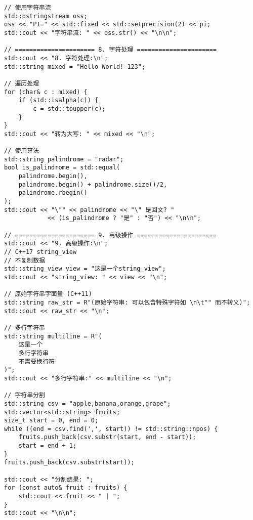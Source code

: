 \begin{lstlisting}
// 使用字符串流
std::ostringstream oss;
oss << "PI=" << std::fixed << std::setprecision(2) << pi;
std::cout << "字符串流: " << oss.str() << "\n\n";

// ====================== 8. 字符处理 ======================
std::cout << "8. 字符处理:\n";
std::string mixed = "Hello World! 123";

// 遍历处理
for (char& c : mixed) {
    if (std::isalpha(c)) {
        c = std::toupper(c);
    }
}
std::cout << "转为大写: " << mixed << "\n";

// 使用算法
std::string palindrome = "radar";
bool is_palindrome = std::equal(
    palindrome.begin(), 
    palindrome.begin() + palindrome.size()/2,
    palindrome.rbegin()
);
std::cout << "\"" << palindrome << "\" 是回文? " 
            << (is_palindrome ? "是" : "否") << "\n\n";

// ====================== 9. 高级操作 ======================
std::cout << "9. 高级操作:\n";
// C++17 string_view
// 不复制数据
std::string_view view = "这是一个string_view"; 
std::cout << "string_view: " << view << "\n";

// 原始字符串字面量 (C++11)
std::string raw_str = R"(原始字符串: 可以包含特殊字符如 \n\t"" 而不转义)";
std::cout << raw_str << "\n";

// 多行字符串
std::string multiline = R"(
    这是一个
    多行字符串
    不需要换行符
)";
std::cout << "多行字符串:" << multiline << "\n";

// 字符串分割
std::string csv = "apple,banana,orange,grape";
std::vector<std::string> fruits;
size_t start = 0, end = 0;
while ((end = csv.find(',', start)) != std::string::npos) {
    fruits.push_back(csv.substr(start, end - start));
    start = end + 1;
}
fruits.push_back(csv.substr(start));

std::cout << "分割结果: ";
for (const auto& fruit : fruits) {
    std::cout << fruit << " | ";
}
std::cout << "\n\n";
\end{lstlisting}